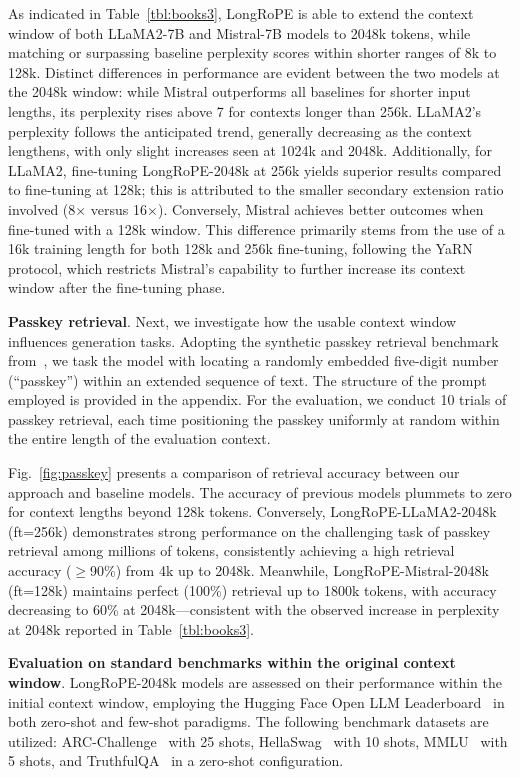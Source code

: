 As indicated in Table~\ref{tbl:books3}, LongRoPE is able to extend the context window of both LLaMA2-7B and Mistral-7B models to 2048k tokens, while matching or surpassing baseline perplexity scores within shorter ranges of 8k to 128k. Distinct differences in performance are evident between the two models at the 2048k window: while Mistral outperforms all baselines for shorter input lengths, its perplexity rises above 7 for contexts longer than 256k. LLaMA2's perplexity follows the anticipated trend, generally decreasing as the context lengthens, with only slight increases seen at 1024k and 2048k. Additionally, for LLaMA2, fine-tuning LongRoPE-2048k at 256k yields superior results compared to fine-tuning at 128k; this is attributed to the smaller secondary extension ratio involved (8$\times$ versus 16$\times$). Conversely, Mistral achieves better outcomes when fine-tuned with a 128k window. This difference primarily stems from the use of a 16k training length for both 128k and 256k fine-tuning, following the YaRN protocol, which restricts Mistral's capability to further increase its context window after the fine-tuning phase.

\textbf{Passkey retrieval}. Next, we investigate how the usable context window influences generation tasks. Adopting the synthetic passkey retrieval benchmark from~\cite{passkey}, we task the model with locating a randomly embedded five-digit number (“passkey”) within an extended sequence of text. The structure of the prompt employed is provided in the appendix. For the evaluation, we conduct 10 trials of passkey retrieval, each time positioning the passkey uniformly at random within the entire length of the evaluation context.

Fig.~\ref{fig:passkey} presents a comparison of retrieval accuracy between our approach and baseline models. The accuracy of previous models plummets to zero for context lengths beyond 128k tokens. Conversely, LongRoPE-LLaMA2-2048k (ft=256k) demonstrates strong performance on the challenging task of passkey retrieval among millions of tokens, consistently achieving a high retrieval accuracy ($\ge$90\%) from 4k up to 2048k. Meanwhile, LongRoPE-Mistral-2048k (ft=128k) maintains perfect (100\%) retrieval up to 1800k tokens, with accuracy decreasing to 60\% at 2048k—consistent with the observed increase in perplexity at 2048k reported in Table~\ref{tbl:books3}.

\textbf{Evaluation on standard benchmarks within the original context window}. LongRoPE-2048k models are assessed on their performance within the initial context window, employing the Hugging Face Open LLM Leaderboard~\cite{huggingfaceboard} in both zero-shot and few-shot paradigms. The following benchmark datasets are utilized: ARC-Challenge~\cite{allenai:arc} with 25 shots, HellaSwag~\cite{zellers2019hellaswag} with 10 shots, MMLU~\cite{mmlu} with 5 shots, and TruthfulQA~\cite{lin2021truthfulqa} in a zero-shot configuration.

